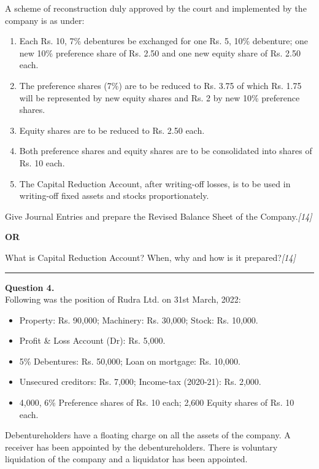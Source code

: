 \documentclass[11pt,a4paper]{article}
\newcommand{\pts}[1]{\hfill   \textit{[#1]}}
\begin{document}
A scheme of reconstruction duly approved by the court and implemented by the company is as under:

\begin{enumerate}[label=(\roman*)]
  \item Each Rs. 10, 7\% debentures be exchanged for one Rs. 5, 10\% debenture; one new 10\% preference share of Rs. 2.50 and one new equity share of Rs. 2.50 each.
  \item The preference shares (7\%) are to be reduced to Rs. 3.75 of which Rs. 1.75 will be represented by new equity shares and Rs. 2 by new 10\% preference shares.
  \item Equity shares are to be reduced to Rs. 2.50 each.
  \item Both preference shares and equity shares are to be consolidated into shares of Rs. 10 each.
  \item The Capital Reduction Account, after writing-off losses, is to be used in writing-off fixed assets and stocks proportionately.
\end{enumerate}

Give Journal Entries and prepare the Revised Balance Sheet of the Company.\pts{14}

\centerline{   \textbf{OR}}

What is Capital Reduction Account? When, why and how is it prepared?\pts{14}

\medskip\rule{\linewidth}{0.2pt}

\pagebreak




\noindent   \textbf{Question 4.} \\
Following was the position of Rudra Ltd. on 31st March, 2022:

\begin{itemize}
  \item Property: Rs. 90,000; Machinery: Rs. 30,000; Stock: Rs. 10,000.
  \item Profit \& Loss Account (Dr): Rs. 5,000.
  \item 5\% Debentures: Rs. 50,000; Loan on mortgage: Rs. 10,000.
  \item Unsecured creditors: Rs. 7,000; Income-tax (2020-21): Rs. 2,000.
  \item 4,000, 6\% Preference shares of Rs. 10 each; 2,600 Equity shares of Rs. 10 each.
\end{itemize}
Debentureholders have a floating charge on all the assets of the company. A receiver has been appointed by the debentureholders. There is voluntary liquidation of the company and a liquidator has been appointed. 
\end{document}
